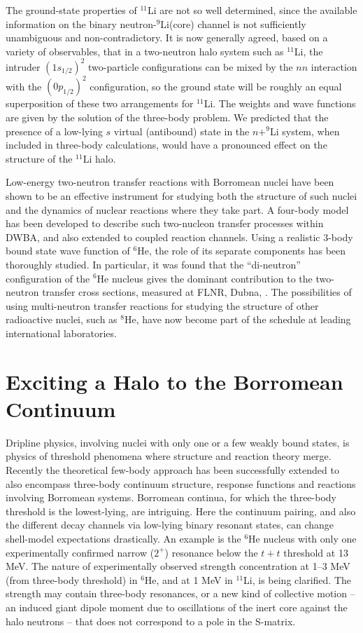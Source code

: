 The ground-state properties of  $^{11}$Li are not so well
determined, since the available information on the binary
neutron-$^9$Li(core) channel is not sufficiently unambiguous and
non-contradictory. It is now generally agreed, based on a variety of observables,
that in a two-neutron halo system such as
$^{11}$Li, the intruder $(1s_{1/2})^2$ two-particle configurations
can be mixed by the $nn$ interaction with the $(0p_{1/2})^2$
configuration, so the ground state will be roughly an equal
superposition of these two arrangements for $^{11}$Li. The weights
and wave functions are given by the solution of the three-body
problem. We predicted \cite{Thompson94} that the presence of a
low-lying $s$ virtual (antibound) state in the $n+^9$Li system,
when included in three-body calculations, would have a pronounced
effect on the structure of the $^{11}$Li halo.

Low-energy two-neutron transfer reactions with Borromean nuclei
have been shown to be an effective instrument for studying both
the structure of such nuclei and the dynamics of nuclear reactions
where they take part. A four-body model has been developed to
describe such two-nucleon transfer processes within DWBA, and also
extended to coupled reaction channels. Using a realistic 3-body
bound state wave function of $^6$He, the role of its separate
components has been thoroughly studied. In particular, it was
found that the ``di-neutron'' configuration of the $^6$He nucleus
gives the dominant contribution to the two-neutron transfer cross
sections, measured at FLNR, Dubna, \cite{zag2}. The possibilities
of using multi-neutron transfer reactions for studying the
structure of other radioactive nuclei, such as $^8$He, have now
become part of the schedule at leading international laboratories.

\section{Exciting a Halo to the Borromean Continuum}

Dripline physics, involving nuclei with only one or a few weakly
bound states, is physics of threshold phenomena where structure and
reaction theory merge. Recently the theoretical few-body approach
has been successfully extended to also encompass three-body
continuum structure, response functions and reactions involving
Borromean systems. Borromean continua, for which the three-body
threshold is the lowest-lying, are intriguing. Here the continuum
pairing, and also the different decay channels via low-lying
binary resonant states, can change shell-model expectations
drastically. An example is the $^6$He nucleus with only one
experimentally confirmed narrow ($2^+$) resonance below the $t+t$
threshold at 13 MeV. The nature of experimentally observed
strength concentration at 1--3 MeV (from three-body threshold) in
$^6$He, and at 1 MeV in $^{11}$Li, is being clarified. The
strength may contain three-body resonances, or a new kind of collective motion
-- an induced giant dipole moment due to oscillations of the inert
core against the halo neutrons -- that does not correspond to a
pole in the S-matrix.

